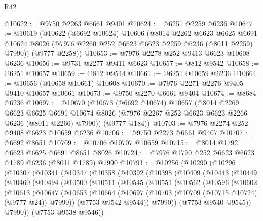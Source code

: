 \begin{lexlean}{R42}
\begin{coremodule}
{@10622 := @9750 @2263 @6661 @9401
@10624 := @6251 @2259 @6236
@10647 := @10619
    (@10622
      (@6692 @10624)
      @10606
      (@8014
        @2262
        @6623
        @6625
        @6691
        @10624
        @8026
        (@7976 @2260 @252 @6623 @6623 @2259 @6236 (@8011 @2259) @7990))
      (@9777 @2258))
@10653 := @7976 @2278 @252 @9413 @6623 @10608 @6236
@10656 := @9731 @2277 @9411 @6623
@10657 := @812 @9542
@10658 := @6251 @10657
@10659 := @812 @9544
@10661 := @6251 @10659 @6236
@10664 := @10656 (@10658 @10661) @10608
@10670 := @7976 @2271 @2276 @9405 @9410 @10657 @10661
@10673 := @9750 @2270 @6661 @9404
@10674 := @8684 @6236
@10697 := @10670
    (@10673
      (@6692 @10674)
      @10657
      (@8014
        @2269
        @6623
        @6625
        @6691
        @10674
        @8026
        (@7976 @2267 @252 @6623 @6623 @2266 @6236 (@8011 @2266) @7990))
      (@9777 @184))
@10703 := @7976 @2274 @252 @9408 @6623 @10659 @6236
@10706 := @9750 @2273 @6661 @9407
@10707 := @6692 @8651
@10709 := @10706 @10707 @10659
@10715 := @8014 @1792 @6623 @6625 @6691 @8651 @8026
@10724 := @7976 @1790 @252 @6623 @6623 @1789 @6236 (@8011 @1789) @7990
@10791 := @10256
    (@10290
      (@10296
        (@10307
          (@10341
            (@10347
              (@10358
                (@10392
                  (@10398
                    (@10409
                      (@10443
                        (@10449
                          (@10460
                            (@10494
                              (@10500
                                (@10511
                                  (@10545
                                    (@10551
                                      (@10562
                                        (@10596
                                          (@10602
                                            (@10613
                                              (@10647
                                                (@10653
                                                  (@10664
                                                    (@10697
                                                      (@10703
                                                        (@10709 (@10715 @10724) (@9777 @24))
                                                        @7990))
                                                    (@7753 @9542 @9544))
                                                  @7990))
                                              (@7753 @9540 @9545))
                                            @7990))
                                        (@7753 @9538 @9546))
}
\end{coremodule}
\end{lexlean}
